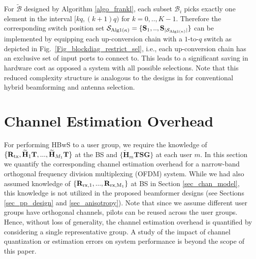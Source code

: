\documentclass[journal,comsoc]{IEEEtran}
\begin{document}
For $\mathcal{\tilde{B}}$ designed by Algorithm \ref{algo_frankl}, each subset $\mathcal{B}_i$ picks exactly one element in the interval $\big[ k q,(k+1)q \big)$ for $k=0,..,K-1$. Therefore the corresponding switch position set $\mathcal{S}_{\rm Alg1(\kappa)} = \{ \mathbf{S}_1,..,\mathbf{S}_{|\mathcal{S}_{\rm Alg1(\kappa)}|} \}$ can be implemented by equipping each up-conversion chain with a $1$-to-$q$ switch as depicted in Fig.~\ref{Fig_blockdiag_restrict_sel}, i.e., each up-conversion chain has an exclusive set of input ports to connect to. This leads to a significant saving in hardware cost as opposed a system with all possible selections. Note that this reduced complexity structure is analogous to the designs in \cite{Xu_iCSI, Rial2016, Gao2018} for conventional hybrid beamforming and antenna selection. 
%
\section{Channel Estimation Overhead} \label{sec_chan_est_overhead}
For performing HBwS to a user group, we require the knowledge of $\{\mathbf{R}_{\rm tx}, \widetilde{\mathbf{H}}_{1} \mathbf{T}, ..., \widetilde{\mathbf{H}}_{M_1} \mathbf{T}\}$ at the BS and $\{\widetilde{\mathbf{H}}_{m} \mathbf{T} \mathbf{S} \mathbf{G}\}$ at each user $m$. In this section we quantify the corresponding channel estimation overhead for a narrow-band orthogonal frequency division multiplexing (OFDM) system. While we had also assumed knowledge of $\{\mathbf{R}_{\rm rx,1}, ..., \mathbf{R}_{\rm rx,M_1}\}$ at BS in Section \ref{sec_chan_model}, this knowledge is not utilized in the proposed beamformer designs (see Sections \ref{sec_pp_design} and \ref{sec_anisotropy}). Note that since we assume different user groups have orthogonal channels, pilots can be reused across the user groups. Hence, without loss of generality, the channel estimation overhead is quantified by considering a single representative group. A study of the impact of channel quantization or estimation errors on system performance is beyond the scope of this paper. 
\end{document}
